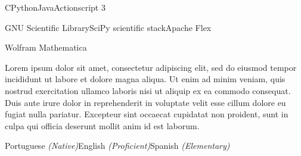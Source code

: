 \begin{cvrows}
	{C\dotsep Python\dotsep Java\dotsep Actionscript 3}
	
	{GNU Scientific Library\dotsep SciPy scientific stack\dotsep Apache Flex}
	
	{Wolfram Mathematica}
	
    {Lorem ipsum dolor sit amet, consectetur adipiscing elit, sed do eiusmod tempor incididunt ut labore et dolore magna aliqua. Ut enim ad minim veniam, quis nostrud exercitation ullamco laboris nisi ut aliquip ex ea commodo consequat. Duis aute irure dolor in reprehenderit in voluptate velit esse cillum dolore eu fugiat nulla pariatur. Excepteur sint occaecat cupidatat non proident, sunt in culpa qui officia deserunt mollit anim id est laborum.}
	
	{Portuguese \textit{(Native)}\dotsep English \textit{(Proficient)}\dotsep Spanish \textit{(Elementary)}}
	
\end{cvrows}

\clearsection
